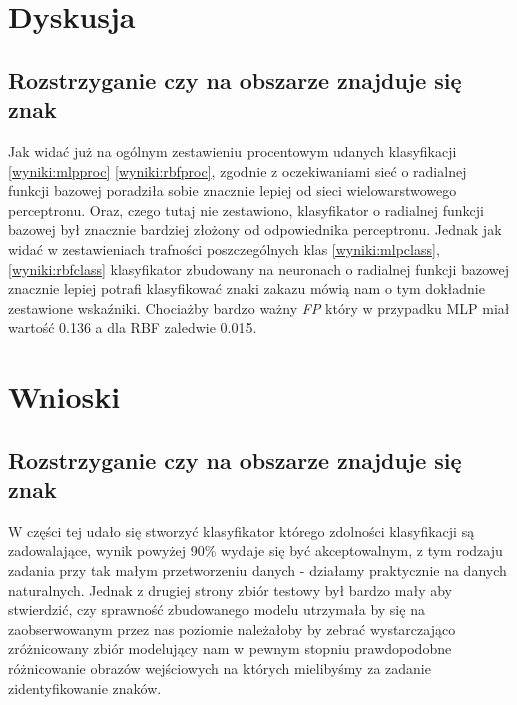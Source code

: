 \documentclass{classrep}
\begin{document}
\section{Dyskusja}


\subsection{Rozstrzyganie czy na obszarze znajduje się znak}
Jak widać już na ogólnym zestawieniu procentowym udanych klasyfikacji \ref{wyniki:mlpproc} \ref{wyniki:rbfproc}, zgodnie z oczekiwaniami sieć o radialnej funkcji bazowej poradziła sobie znacznie lepiej od sieci wielowarstwowego perceptronu. Oraz, czego tutaj nie zestawiono, klasyfikator o radialnej funkcji bazowej był znacznie bardziej złożony od odpowiednika perceptronu. Jednak jak widać w zestawieniach trafności poszczególnych klas \ref{wyniki:mlpclass}, \ref{wyniki:rbfclass} klasyfikator zbudowany na neuronach o radialnej funkcji bazowej znacznie lepiej potrafi klasyfikować znaki zakazu mówią nam o tym dokładnie zestawione wskaźniki. Chociażby bardzo ważny \emph{FP} który w przypadku MLP miał wartość 0.136 a dla RBF zaledwie 0.015.


\section{Wnioski}

\subsection{Rozstrzyganie czy na obszarze znajduje się znak}
W części tej udało się stworzyć klasyfikator którego zdolności klasyfikacji są zadowalające, wynik powyżej 90\% wydaje się być akceptowalnym, z tym rodzaju zadania przy tak małym przetworzeniu danych - działamy praktycznie na danych naturalnych. Jednak z drugiej strony zbiór testowy był bardzo mały aby stwierdzić, czy sprawność zbudowanego modelu utrzymała by się na zaobserwowanym przez nas poziomie należałoby by zebrać wystarczająco zróżnicowany zbiór modelujący nam w pewnym stopniu prawdopodobne różnicowanie obrazów wejściowych na których mielibyśmy za zadanie zidentyfikowanie znaków. 




\end{document}
